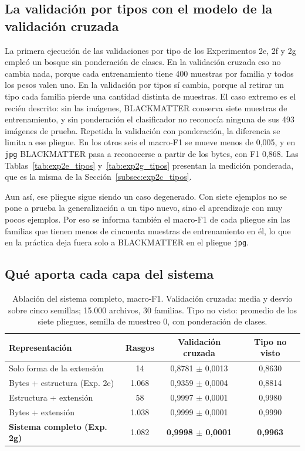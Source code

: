 \subsection{La validación por tipos con el modelo de la validación cruzada}

La primera ejecución de las validaciones por tipo de los Experimentos 2e, 2f y 2g empleó un bosque sin ponderación de clases. En la validación cruzada eso no cambia nada, porque cada entrenamiento tiene 400 muestras por familia y todos los pesos valen uno. En la validación por tipos sí cambia, porque al retirar un tipo cada familia pierde una cantidad distinta de muestras. El caso extremo es el recién descrito: sin las imágenes, BLACKMATTER conserva siete muestras de entrenamiento, y sin ponderación el clasificador no reconocía ninguna de sus 493 imágenes de prueba. Repetida la validación con ponderación, la diferencia se limita a ese pliegue. En los otros seis el macro-F1 se mueve menos de 0,005, y en \texttt{jpg} BLACKMATTER pasa a reconocerse a partir de los bytes, con F1 0,868. Las Tablas~\ref{tab:exp2e_tipos} y~\ref{tab:exp2g_tipos} presentan la medición ponderada, que es la misma de la Sección~\ref{subsec:exp2c_tipos}.

Aun así, ese pliegue sigue siendo un caso degenerado. Con siete ejemplos no se pone a prueba la generalización a un tipo nuevo, sino el aprendizaje con muy pocos ejemplos. Por eso se informa también el macro-F1 de cada pliegue sin las familias que tienen menos de cincuenta muestras de entrenamiento en él, lo que en la práctica deja fuera solo a BLACKMATTER en el pliegue \texttt{jpg}.

\subsection{Qué aporta cada capa del sistema}

\begin{table}[ht]
\centering
\caption{Ablación del sistema completo, macro-F1. Validación cruzada: media y desvío sobre cinco semillas; 15.000 archivos, 30 familias. Tipo no visto: promedio de los siete pliegues, semilla de muestreo 0, con ponderación de clases.}
\label{tab:exp2h_ablacion}
\begin{tabular}{|l|c|c|c|}
\hline
\textbf{Representación} & \textbf{Rasgos} & \textbf{Validación cruzada} & \textbf{Tipo no visto} \\
\hline
Solo forma de la extensión & 14 & 0,8781 $\pm$ 0,0013 & 0,8630 \\
Bytes + estructura (Exp. 2e) & 1.068 & 0,9359 $\pm$ 0,0004 & 0,8814 \\
Estructura + extensión & 58 & 0,9997 $\pm$ 0,0001 & 0,9980 \\
Bytes + extensión & 1.038 & 0,9999 $\pm$ 0,0001 & 0,9990 \\
\textbf{Sistema completo (Exp. 2g)} & 1.082 & \textbf{0,9998 $\pm$ 0,0001} & \textbf{0,9963} \\
\hline
\end{tabular}
\end{table}

